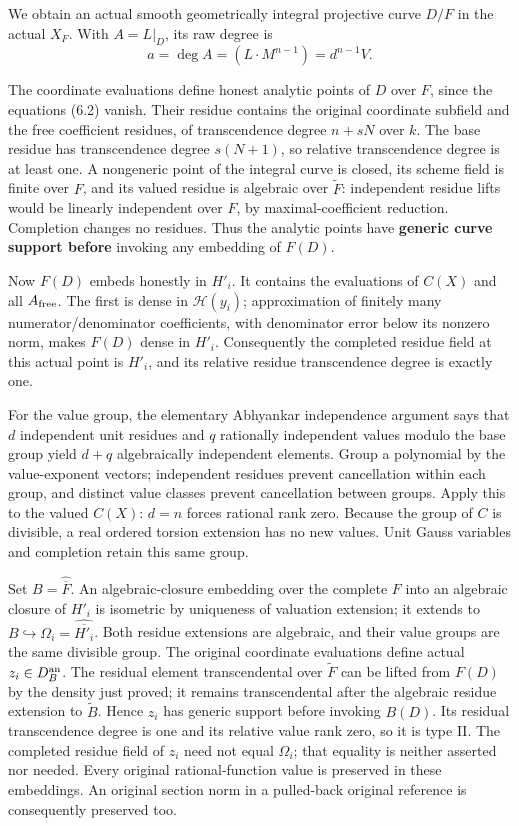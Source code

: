 \documentclass[
  11pt,
]{article}
\begin{document}
We obtain an actual smooth geometrically integral projective curve
\(D/F\) in the actual \(X_F\). With \(A=L|_D\), its raw degree is \[
 a=\deg A=(L\cdot M^{n-1})=d^{n-1}V. \tag{6.3}
\]

The coordinate evaluations define honest analytic points of \(D\) over
\(F\), since the equations (6.2) vanish. Their residue contains the
original coordinate subfield and the free coefficient residues, of
transcendence degree \(n+sN\) over \(k\). The base residue has
transcendence degree \(s(N+1)\), so relative transcendence degree is at
least one. A nongeneric point of the integral curve is closed, its
scheme field is finite over \(F\), and its valued residue is algebraic
over \(\widetilde F\): independent residue lifts would be linearly
independent over \(F\), by maximal-coefficient reduction. Completion
changes no residues. Thus the analytic points have \textbf{generic curve
support before} invoking any embedding of \(F(D)\).

Now \(F(D)\) embeds honestly in \(H'_i\). It contains the evaluations of
\(C(X)\) and all \(A_{\rm free}\). The first is dense in
\(\mathcal H(y_i)\); approximation of finitely many
numerator/denominator coefficients, with denominator error below its
nonzero norm, makes \(F(D)\) dense in \(H'_i\). Consequently the
completed residue field at this actual point is \(H'_i\), and its
relative residue transcendence degree is exactly one.

For the value group, the elementary Abhyankar independence argument says
that \(d\) independent unit residues and \(q\) rationally independent
values modulo the base group yield \(d+q\) algebraically independent
elements. Group a polynomial by the value-exponent vectors; independent
residues prevent cancellation within each group, and distinct value
classes prevent cancellation between groups. Apply this to the valued
\(C(X)\): \(d=n\) forces rational rank zero. Because the group of \(C\)
is divisible, a real ordered torsion extension has no new values. Unit
Gauss variables and completion retain this same group.

Set \(B=\widehat{\overline F}\). An algebraic-closure embedding over the
complete \(F\) into an algebraic closure of \(H'_i\) is isometric by
uniqueness of valuation extension; it extends to
\(B\hookrightarrow\Omega_i=\widehat{\overline{H'_i}}\). Both residue
extensions are algebraic, and their value groups are the same divisible
group. The original coordinate evaluations define actual
\(z_i\in D_B^{\rm an}\). The residual element transcendental over
\(\widetilde F\) can be lifted from \(F(D)\) by the density just proved;
it remains transcendental after the algebraic residue extension to
\(\widetilde B\). Hence \(z_i\) has generic support before invoking
\(B(D)\). Its residual transcendence degree is one and its relative
value rank zero, so it is type II. The completed residue field of
\(z_i\) need not equal \(\Omega_i\); that equality is neither asserted
nor needed. Every original rational-function value is preserved in these
embeddings. An original section norm in a pulled-back original reference
is consequently preserved too.
\end{document}
